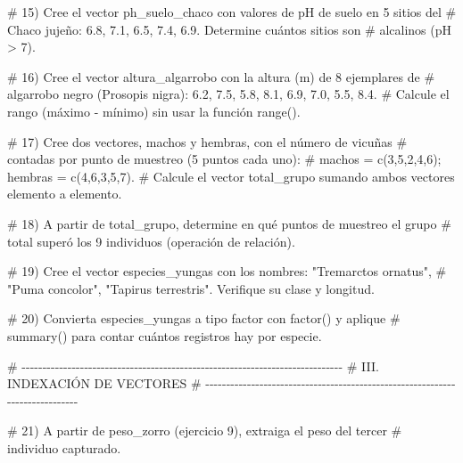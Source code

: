 \documentclass[
  spanish,
  letterpaper,
  DIV=11,
  numbers=noendperiod]{scrreprt}
\newenvironment{Shaded}{\begin{snugshade}}{\end{snugshade}}
\newcommand{\CommentTok}[1]{\textcolor[rgb]{0.37,0.37,0.37}{#1}}
\begin{document}
\begin{Shaded}
\begin{Highlighting}[]
\CommentTok{\# 15) Cree el vector \textquotesingle{}ph\_suelo\_chaco\textquotesingle{} con valores de pH de suelo en 5 sitios del}
\CommentTok{\#     Chaco jujeño: 6.8, 7.1, 6.5, 7.4, 6.9. Determine cuántos sitios son}
\CommentTok{\#     alcalinos (pH \textgreater{} 7).}


\CommentTok{\# 16) Cree el vector \textquotesingle{}altura\_algarrobo\textquotesingle{} con la altura (m) de 8 ejemplares de}
\CommentTok{\#     algarrobo negro (Prosopis nigra): 6.2, 7.5, 5.8, 8.1, 6.9, 7.0, 5.5, 8.4.}
\CommentTok{\#     Calcule el rango (máximo {-} mínimo) sin usar la función range().}


\CommentTok{\# 17) Cree dos vectores, \textquotesingle{}machos\textquotesingle{} y \textquotesingle{}hembras\textquotesingle{}, con el número de vicuñas}
\CommentTok{\#     contadas por punto de muestreo (5 puntos cada uno):}
\CommentTok{\#     machos = c(3,5,2,4,6); hembras = c(4,6,3,5,7).}
\CommentTok{\#     Calcule el vector \textquotesingle{}total\_grupo\textquotesingle{} sumando ambos vectores elemento a elemento.}


\CommentTok{\# 18) A partir de \textquotesingle{}total\_grupo\textquotesingle{}, determine en qué puntos de muestreo el grupo}
\CommentTok{\#     total superó los 9 individuos (operación de relación).}


\CommentTok{\# 19) Cree el vector \textquotesingle{}especies\_yungas\textquotesingle{} con los nombres: "Tremarctos ornatus",}
\CommentTok{\#     "Puma concolor", "Tapirus terrestris". Verifique su clase y longitud.}


\CommentTok{\# 20) Convierta \textquotesingle{}especies\_yungas\textquotesingle{} a tipo factor con factor() y aplique}
\CommentTok{\#     summary() para contar cuántos registros hay por especie.}


\CommentTok{\# {-}{-}{-}{-}{-}{-}{-}{-}{-}{-}{-}{-}{-}{-}{-}{-}{-}{-}{-}{-}{-}{-}{-}{-}{-}{-}{-}{-}{-}{-}{-}{-}{-}{-}{-}{-}{-}{-}{-}{-}{-}{-}{-}{-}{-}{-}{-}{-}{-}{-}{-}{-}{-}{-}{-}{-}{-}{-}{-}{-}{-}{-}{-}{-}{-}{-}{-}{-}{-}{-}{-}{-}{-}{-}{-}{-}{-}}
\CommentTok{\# III. INDEXACIÓN DE VECTORES}
\CommentTok{\# {-}{-}{-}{-}{-}{-}{-}{-}{-}{-}{-}{-}{-}{-}{-}{-}{-}{-}{-}{-}{-}{-}{-}{-}{-}{-}{-}{-}{-}{-}{-}{-}{-}{-}{-}{-}{-}{-}{-}{-}{-}{-}{-}{-}{-}{-}{-}{-}{-}{-}{-}{-}{-}{-}{-}{-}{-}{-}{-}{-}{-}{-}{-}{-}{-}{-}{-}{-}{-}{-}{-}{-}{-}{-}{-}{-}{-}}

\CommentTok{\# 21) A partir de \textquotesingle{}peso\_zorro\textquotesingle{} (ejercicio 9), extraiga el peso del tercer}
\CommentTok{\#     individuo capturado.}



\end{Highlighting}
\end{Shaded}
\end{document}
